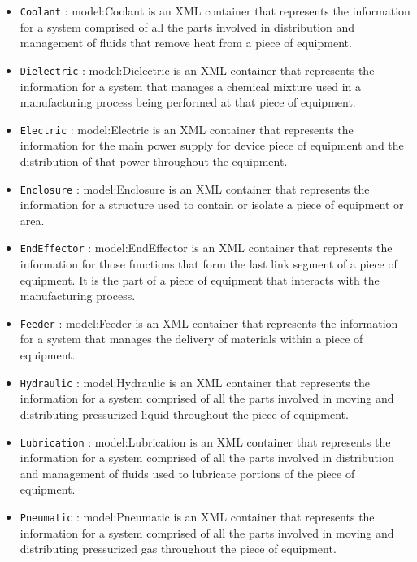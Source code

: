 \begin{itemize}
\item \texttt{Coolant} : {model:Coolant} is an XML container that represents the information for a system comprised of all the parts involved in distribution and management of fluids that remove heat from a piece of equipment.

\item \texttt{Dielectric} : {model:Dielectric} is an XML container that represents the information for a system that manages a chemical mixture used in a manufacturing process being performed at that piece of equipment.

\item \texttt{Electric} : {model:Electric} is an XML container that represents the information for the main power supply for device piece of equipment and the distribution of that power throughout the equipment.

\item \texttt{Enclosure} : {model:Enclosure} is an XML container that represents the information for a structure used to contain or isolate a piece of equipment or area.

\item \texttt{EndEffector} : {model:EndEffector} is an XML container that represents the information for those functions that form the last link segment of a piece of equipment. It is the part of a piece of equipment that interacts with the manufacturing process.

\item \texttt{Feeder} : {model:Feeder} is an XML container that represents the information for a system that manages the delivery of materials within a piece of equipment.

\item \texttt{Hydraulic} : {model:Hydraulic} is an XML container that represents the information for a system comprised of all the parts involved in moving and distributing pressurized liquid throughout the piece of equipment.

\item \texttt{Lubrication} : {model:Lubrication} is an XML container that represents the information for a system comprised of all the parts involved in distribution and management of fluids used to lubricate portions of the piece of equipment.

\item \texttt{Pneumatic} : {model:Pneumatic} is an XML container that represents the information for a system comprised of all the parts involved in moving and distributing pressurized gas throughout the piece of equipment.


\end{itemize}
